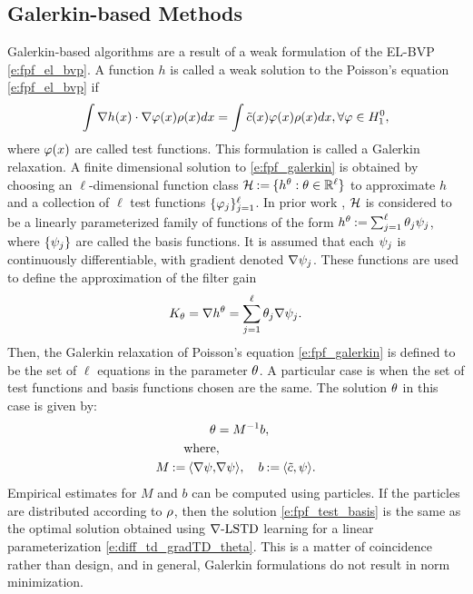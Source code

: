 \subsection{Galerkin-based Methods}
\label{s:galerkin}
Galerkin-based algorithms are a result of a weak formulation of the EL-BVP \eqref{e:fpf_el_bvp}. A function $h$ is called a weak solution to the Poisson's equation \eqref{e:fpf_el_bvp} if
\begin{equation}
\int \nabla h (x) \cdot \nabla \test(x)  \pr(x) dx = \int \tilc(x) \test(x) \pr(x) dx, \forall \test \in H^0_1,
\label{e:fpf_galerkin}
\end{equation}
where $\varphi(x)$ are called test functions. This formulation is called a Galerkin relaxation. 
A finite dimensional solution to \eqref{e:fpf_galerkin} is obtained by choosing an $\ell$-dimensional  function class
${\cal H}  \mathbin{:=} \{h^\theta : \theta \in \mathbb{R}^\ell\}$ to approximate $h$ and a collection of $\ell$ test functions $\{\varphi_j\}_{j=1}^{\ell}$. In prior work \cite{yanmehmey13,yanlaumehmey16}, ${\cal H}$ is considered to be a linearly parameterized family of functions of the form $h^\theta \mathbin{:=} \sum_{j=1}^{\ell}\theta_{j}\psi_{j} $, where $\{\psi_j\}$ are called the basis functions.  It is assumed that each $\psi_j$ is continuously differentiable,  with gradient denoted   $\nabla \psi_{j} $.
 These   functions are used to define the approximation of the filter gain
\begin{equation}
K_\param = \nabla h^\param= \sum_{j=1}^{\ell}\param_{j}\gradbasis_{j}.
\label{e:fpf_basis_galerkin}
\end{equation}
Then, the Galerkin relaxation of Poisson's equation \eqref{e:fpf_galerkin} is defined to be the set of $\ell$ equations in the parameter $\theta$. A particular case is when the set of test functions and basis functions chosen are the same. The solution $\theta$ in this case is given by:
\begin{equation}
\begin{aligned}
\param & = M^{-1} b, \\
\text{where}&,\\ 
M \eqdef \langle \gradbasis, &\gradbasis \rangle, \quad b \eqdef \langle \tilc, \basis \rangle.
\label{e:fpf_test_basis}
\end{aligned}
\end{equation}
Empirical estimates for $M$ and $b$ can be computed using particles. If the particles are distributed according to $\rho$, then the solution \eqref{e:fpf_test_basis} is the same as the optimal solution obtained using $\nabla\text{-LSTD}$ learning for a linear parameterization \eqref{e:diff_td_gradTD_theta}. This is a matter of coincidence rather than design, and in general, Galerkin formulations do not result in norm minimization. 

